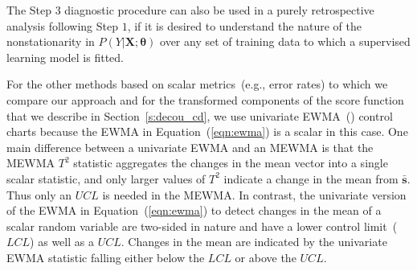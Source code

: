 \documentclass[twoside,11pt]{article}
\begin{document}
The Step $3$ diagnostic procedure can also be used in a purely retrospective analysis following Step $1$, if it is desired to understand the nature of the nonstationarity in $P(Y|\bm{X};\bm{\theta})$ over any set of training data to which a supervised learning model is fitted.
 
For the other methods based on scalar metrics~(e.g., error rates) to which we compare our approach and for the transformed components of the score function that we describe in Section~\ref{s:decou_cd}, we use univariate EWMA~(\cite{roberts1959control}) control charts because the EWMA in Equation~(\ref{eqn:ewma}) is a scalar in this case. One main difference between a univariate EWMA and an MEWMA is that the MEWMA $T^2$ statistic aggregates the changes in the mean vector into a single scalar statistic, and only larger values of $T^2$ indicate a change in the mean from $\bar{\bm{s}}$. Thus only an $UCL$ is needed in the MEWMA. In contrast, the univariate version of the EWMA in Equation~(\ref{eqn:ewma}) to detect changes in the mean of a scalar random variable are two-sided in nature and have a lower control limit~($LCL$) as well as a $UCL$. Changes in the mean are indicated by the univariate EWMA statistic falling either below the $LCL$ or above the $UCL$.

\end{document}
